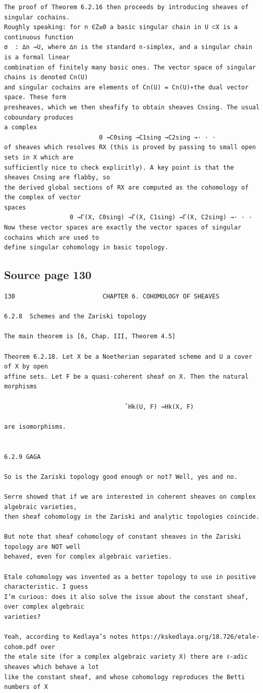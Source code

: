 \begin{Verbatim}[fontsize=\small]
The proof of Theorem 6.2.16 then proceeds by introducing sheaves of singular cochains.
Roughly speaking: for n ∈Z≥0 a basic singular chain in U ⊂X is a continuous function
σ  : ∆n →U, where ∆n is the standard n-simplex, and a singular chain is a formal linear
combination of finitely many basic ones. The vector space of singular chains is denoted Cn(U)
and singular cochains are elements of Cn(U) = Cn(U)∗the dual vector space. These form
presheaves, which we then sheafify to obtain sheaves Cnsing. The usual coboundary produces
a complex
                          0 →C0sing →C1sing →C2sing →· · ·
of sheaves which resolves RX (this is proved by passing to small open sets in X which are
sufficiently nice to check explicitly). A key point is that the sheaves Cnsing are flabby, so
the derived global sections of RX are computed as the cohomology of the complex of vector
spaces
                  0 →Γ(X, C0sing) →Γ(X, C1sing) →Γ(X, C2sing) →· · ·
Now these vector spaces are exactly the vector spaces of singular cochains which are used to
define singular cohomology in basic topology.
\end{Verbatim}

\subsection*{Source page 130}
\begin{Verbatim}[fontsize=\small]
130                        CHAPTER 6. COHOMOLOGY OF SHEAVES

6.2.8  Schemes and the Zariski topology

The main theorem is [6, Chap. III, Theorem 4.5]

Theorem 6.2.18. Let X be a Noetherian separated scheme and U a cover of X by open
affine sets. Let F be a quasi-coherent sheaf on X. Then the natural morphisms

                                 ˇHk(U, F) →Hk(X, F)

are isomorphisms.


6.2.9 GAGA

So is the Zariski topology good enough or not? Well, yes and no.

Serre showed that if we are interested in coherent sheaves on complex algebraic varieties,
then sheaf cohomology in the Zariski and analytic topologies coincide.

But note that sheaf cohomology of constant sheaves in the Zariski topology are NOT well
behaved, even for complex algebraic varieties.

Etale cohomology was invented as a better topology to use in positive characteristic. I guess
I’m curious: does it also solve the issue about the constant sheaf, over complex algebraic
varieties?

Yeah, according to Kedlaya’s notes https://kskedlaya.org/18.726/etale-cohom.pdf over
the etale site (for a complex algebraic variety X) there are ℓ-adic sheaves which behave a lot
like the constant sheaf, and whose cohomology reproduces the Betti numbers of X
\end{Verbatim}